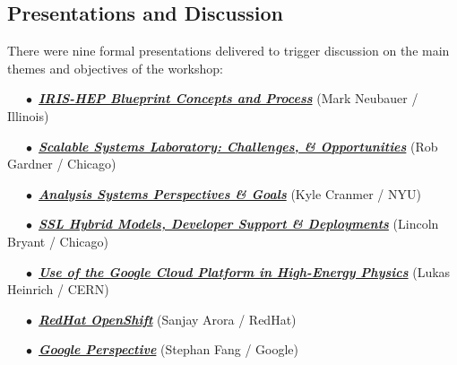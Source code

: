 \documentclass[11pt,letterpaper,fleqn]{article}
\begin{document}

\subsection{Presentations and Discussion}
\vspace{0.2cm}
There were nine formal presentations delivered to trigger discussion on the main themes and objectives of the workshop:

\vspace{0.2cm}

\noindent~~~$\bullet$~\href{https://indico.cern.ch/event/820946/contributions/3461588/attachments/1866577/3069573/IRIS-HEP_BluePrint_AS_SSL.pdf}{\textbf{\textit{IRIS-HEP Blueprint Concepts and Process}}} (Mark Neubauer / Illinois)

\noindent~~~$\bullet$~\href{https://indico.cern.ch/event/820946/contributions/3461590/attachments/1866979/3070394/2019.06.21_SSL_Overview_Rob.pdf}{\textbf{\textit{Scalable Systems Laboratory: Challenges, \& Opportunities}}} (Rob Gardner / Chicago)

\noindent~~~$\bullet$~\href{https://indico.cern.ch/event/820946/contributions/3461589/attachments/1867063/3070546/AS-SSL-Blueprint.pdf}{\textbf{\textit{Analysis Systems Perspectives \& Goals}}} (Kyle Cranmer / NYU)

\noindent~~~$\bullet$~\href{https://indico.cern.ch/event/820946/contributions/3461592/attachments/1866998/3119402/2019.06.21_SSL_Patterns__Deployments_Lincoln.pdf}{\textbf{\textit{SSL Hybrid Models, Developer Support \& Deployments}}} (Lincoln Bryant / Chicago)

\noindent~~~$\bullet$~\href{https://indico.cern.ch/event/820946/contributions/3461593/attachments/1867157/3070768/go}{\textbf{\textit{Use of the Google Cloud Platform in High-Energy Physics}}} (Lukas Heinrich / CERN)

\noindent~~~$\bullet$~\href{https://indico.cern.ch/event/820946/contributions/3461594/attachments/1867161/3070777/OpenShift_4.pdf}{\textbf{\textit{RedHat OpenShift}}} (Sanjay Arora / RedHat)

\noindent~~~$\bullet$~\href{https://indico.cern.ch/event/820946/contributions/3461593/attachments/1867157/3070794/go}{\textbf{\textit{Google Perspective}}} (Stephan Fang / Google)
\end{document}
